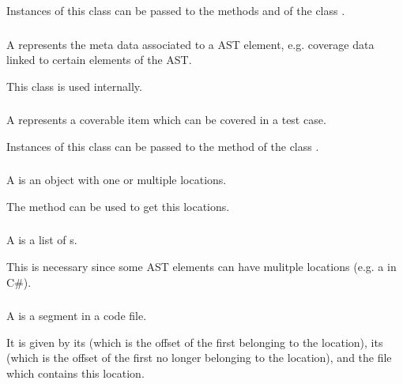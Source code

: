 Instances of this class can be passed to the methods
 and 
of the class .

\subsubsection[MetaData]{}

A  represents the meta data associated to a AST element,
e.g. coverage data linked to certain elements of the AST.

This class is used internally.

\subsubsection[CoverableItem]{}

A  represents a coverable item which can be covered in
a test case.

Instances of this class can be passed to the method 
of the class .

\subsubsection[Locatable]{}

A  is an object with one or multiple locations.

The method  can be used to get this locations.

\subsubsection[LocationList]{}

A  is a list of s.

This is necessary since some AST elements can have mulitple locations
(e.g. a  in C\#).

\subsubsection[Location]{}

A  is a segment in a code file.

It is given by its  (which is the offset of the
first  belonging to the location), its 
(which is the offset of the first  no longer belonging to the
location), and the file which contains this location.

